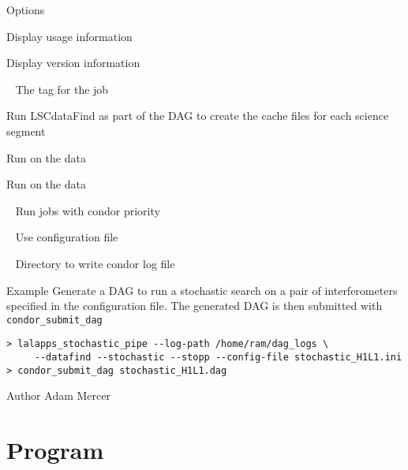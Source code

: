 \begin{entry}
\item[Options]\leavevmode
\begin{entry}
\item[\option{--help}] Display usage information
\item[\option{--version}] Display version information
\item[\option{--user-tag}~\parm{TAG}] The tag for the job
\item[\option{--datafind}] Run LSCdataFind as part of the DAG to create
the cache files for each science segment
\item[\option{--stochastic}] Run  on the data
\item[\option{--stopp}] Run  on the data
\item[\option{--priority}~\parm{PRIO}] Run jobs with condor priority 
\item[\option{--config-file}~\parm{FILE}] Use configuration file 
\item[\option{--log-path}~\parm{PATH}] Directory to write condor log file
\end{entry}

\item[Example]
Generate a DAG to run a stochastic search on a pair of interferometers
specified in the configuration file. The generated DAG is then submitted
with \texttt{condor\_submit\_dag}

\begin{verbatim}
> lalapps_stochastic_pipe --log-path /home/ram/dag_logs \
     --datafind --stochastic --stopp --config-file stochastic_H1L1.ini
> condor_submit_dag stochastic_H1L1.dag
\end{verbatim}

\item[Author]
Adam Mercer
\end{entry}

\clearpage
\section{Program }
\label{program:lalapps-stochastic-bayes}


